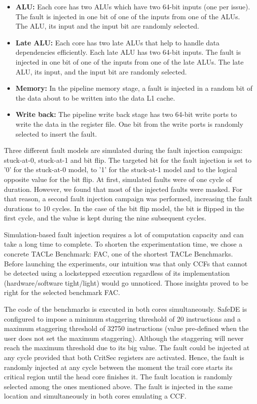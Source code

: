\begin{itemize}
    \item \textbf{ALU:} Each core has two ALUs which have two 64-bit inputs (one per issue). The fault is injected in one bit of one of the inputs from one of the ALUs. The ALU, its input and the input bit are randomly selected. 
    \item \textbf{Late ALU:} Each core has two late ALUs that help to handle data dependencies efficiently. Each late ALU has two 64-bit inputs. The fault is injected in one bit of one of the inputs from one of the late ALUs. The late ALU, its input, and the input bit are randomly selected.
    \item \textbf{Memory:} In the pipeline memory stage, a fault is injected in a random bit of the data about to be written into the data L1 cache.
    \item \textbf{Write back:} The pipeline write back stage has two 64-bit write ports to write the data in the register file. One bit from the write ports is randomly selected to insert the fault.
\end{itemize}

Three different fault models are simulated during the fault injection campaign: stuck-at-0, stuck-at-1 and bit flip. The targeted bit for the fault injection is set to '0' for the stuck-at-0 model, to '1' for the stuck-at-1 model and to the logical opposite value for the bit flip. At first, simulated faults were of one cycle of duration. However, we found that most of the injected faults were masked. For that reason, a second fault injection campaign was performed, increasing the fault durations to 10 cycles. In the case of the bit flip model, the bit is flipped in the first cycle, and the value is kept during the nine subsequent cycles.

Simulation-based fault injection requires a lot of computation capacity and can take a long time to complete. To shorten the experimentation time, we chose a concrete TACLe Benchmark: FAC, one of the shortest TACLe Benchmarks. Before launching the experiments, our intuition was that only CCFs that cannot be detected using a lockstepped execution regardless of its implementation (hardware/software tight/light) would go unnoticed. Those insights proved to be right for the selected benchmark FAC.

The code of the benchmarks is executed in both cores simultaneously. SafeDE is configured to impose a minimum staggering threshold of 20 instructions and a maximum staggering threshold of 32750 instructions (value pre-defined when the user does not set the maximum staggering). Although the staggering will never reach the maximum threshold due to its big value. The fault could be injected at any cycle provided that both CritSec registers are activated. Hence, the fault is randomly injected at any cycle between the moment the trail core starts its critical region until the head core finishes it. The fault location is randomly selected among the ones mentioned above. The fault is injected in the same location and simultaneously in both cores emulating a CCF.

